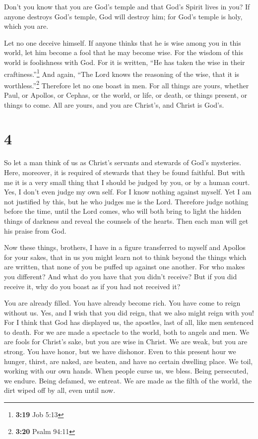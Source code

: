  Don't you know that you are God's temple and that God's
Spirit lives in you?  If anyone destroys God's temple,
God will destroy him; for God's temple is holy, which you are.

 Let no one deceive himself. If anyone thinks that he is
wise among you in this world, let him become a fool that he may become
wise.  For the wisdom of this world is foolishness with
God. For it is written, ``He has taken the wise in their
craftiness.''\footnote{\textbf{3:19} Job 5:13}  And
again, ``The Lord knows the reasoning of the wise, that it is
worthless.''\footnote{\textbf{3:20} Psalm 94:11} 
Therefore let no one boast in men. For all things are yours,
 whether Paul, or Apollos, or Cephas, or the world, or
life, or death, or things present, or things to come. All are yours,
 and you are Christ's, and Christ is God's.

\hypertarget{section-3}{%
\section{4}\label{section-3}}

 So let a man think of us as Christ's servants and
stewards of God's mysteries.  Here, moreover, it is
required of stewards that they be found faithful.  But
with me it is a very small thing that I should be judged by you, or by a
human court. Yes, I don't even judge my own self.  For I
know nothing against myself. Yet I am not justified by this, but he who
judges me is the Lord.  Therefore judge nothing before the
time, until the Lord comes, who will both bring to light the hidden
things of darkness and reveal the counsels of the hearts. Then each man
will get his praise from God.

 Now these things, brothers, I have in a figure
transferred to myself and Apollos for your sakes, that in us you might
learn not to think beyond the things which are written, that none of you
be puffed up against one another.  For who makes you
different? And what do you have that you didn't receive? But if you did
receive it, why do you boast as if you had not received it?

 You are already filled. You have already become rich. You
have come to reign without us. Yes, and I wish that you did reign, that
we also might reign with you!  For I think that God has
displayed us, the apostles, last of all, like men sentenced to death.
For we are made a spectacle to the world, both to angels and men.
 We are fools for Christ's sake, but you are wise in
Christ. We are weak, but you are strong. You have honor, but we have
dishonor.  Even to this present hour we hunger, thirst,
are naked, are beaten, and have no certain dwelling place.
 We toil, working with our own hands. When people curse
us, we bless. Being persecuted, we endure.  Being
defamed, we entreat. We are made as the filth of the world, the dirt
wiped off by all, even until now.

